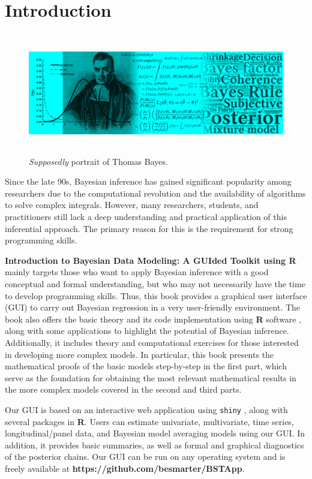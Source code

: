 \chapter*{Introduction}
\begin{figure}[h]
	\includegraphics[width=340pt, height=150pt]{frontmatter/figures/BannerBook.jpg}
	\caption[List of figure caption goes here]{\textit{Supposedly} portrait of Thomas Bayes.}\label{fig01}
\end{figure}

Since the late 90s, Bayesian inference has gained significant popularity among researchers due to the computational revolution and the availability of algorithms to solve complex integrals. However, many researchers, students, and practitioners still lack a deep understanding and practical application of this inferential approach. The primary reason for this is the requirement for strong programming skills.


\textbf{Introduction to Bayesian Data Modeling: A GUIded Toolkit using R} mainly targets those who want to apply Bayesian inference with a good conceptual and formal understanding, but who may not necessarily have the time to develop programming skills. Thus, this book provides a graphical user interface (GUI) to carry out Bayesian regression in a very user-friendly environment. The book also offers the basic theory and its code implementation using \textbf{R} software \cite{R2021}, along with some applications to highlight the potential of Bayesian inference. Additionally, it includes theory and computational exercises for those interested in developing more complex models. In particular, this book presents the mathematical proofs of the basic models step-by-step in the first part, which serve as the foundation for obtaining the most relevant mathematical results in the more complex models covered in the second and third parts.

Our GUI is based on an interactive web application using \texttt{shiny} \cite{Chang2018}, along with several packages in \textbf{R}. Users can estimate univariate, multivariate, time series, longitudinal/panel data, and Bayesian model averaging models using our GUI. In addition, it provides basic summaries, as well as formal and graphical diagnostics of the posterior chains. Our GUI can be run on any operating system and is freely available at \textbf{https://github.com/besmarter/BSTApp}.

